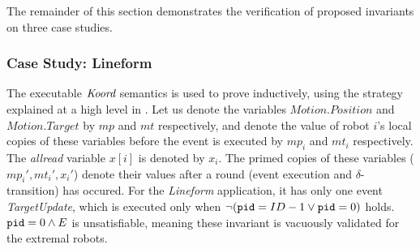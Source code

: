  The remainder of this section demonstrates the verification of proposed invariants on three case studies.















\subsubsection*{Case Study: Lineform}
The executable $\emph{Koord}$ semantics is used to prove  inductively, using the strategy explained at a high level in . Let us denote the variables $\mathit{Motion.Position}$ and $\mathit{Motion.Target}$ by $\mathit{mp}$ and $\mathit{mt}$ respectively,  and denote the value of robot $i$'s local copies of these variables before the event is executed by $\mathit{mp}_i$ and $\mathit{mt}_i$ respectively. The \emph{allread} variable $x[i]$ is denoted by $x_i$. The primed copies of these variables ($\mathit{mp_i', mt_i',x_i'}$) denote their values after a round (event execution and $\delta$-transition) has occured. For the \emph{Lineform} application, it has only one event \emph{TargetUpdate}, which is executed only when $\neg (\texttt{pid} = ID - 1 \vee \texttt{pid} = 0)$ holds. $\texttt{pid} = 0 \wedge E$ is unsatisfiable, meaning these invariant is vacuously validated for the extremal robots.


